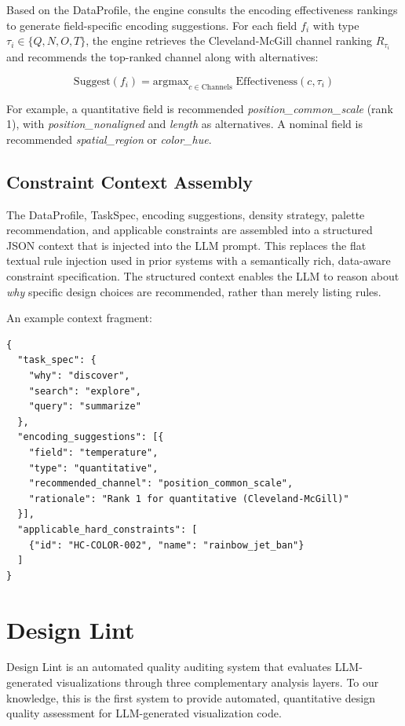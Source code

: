 \documentclass[journal]{vgtc}
\begin{document}
Based on the DataProfile, the engine consults the encoding effectiveness rankings to generate field-specific encoding suggestions.
For each field $f_i$ with type $\tau_i \in \{Q, N, O, T\}$, the engine retrieves the Cleveland-McGill channel ranking $R_{\tau_i}$ and recommends the top-ranked channel along with alternatives:

\begin{equation}
\text{Suggest}(f_i) = \text{argmax}_{c \in \text{Channels}} \; \text{Effectiveness}(c, \tau_i)
\end{equation}

For example, a quantitative field is recommended \textit{position\_common\_scale} (rank 1), with \textit{position\_nonaligned} and \textit{length} as alternatives.
A nominal field is recommended \textit{spatial\_region} or \textit{color\_hue}.

\subsection{Constraint Context Assembly}

The DataProfile, TaskSpec, encoding suggestions, density strategy, palette recommendation, and applicable constraints are assembled into a structured JSON context that is injected into the LLM prompt.
This replaces the flat textual rule injection used in prior systems with a semantically rich, data-aware constraint specification.
The structured context enables the LLM to reason about \textit{why} specific design choices are recommended, rather than merely listing rules.

An example context fragment:
\begin{verbatim}
{
  "task_spec": {
    "why": "discover",
    "search": "explore",
    "query": "summarize"
  },
  "encoding_suggestions": [{
    "field": "temperature",
    "type": "quantitative",
    "recommended_channel": "position_common_scale",
    "rationale": "Rank 1 for quantitative (Cleveland-McGill)"
  }],
  "applicable_hard_constraints": [
    {"id": "HC-COLOR-002", "name": "rainbow_jet_ban"}
  ]
}
\end{verbatim}

\section{Design Lint}

Design Lint is an automated quality auditing system that evaluates LLM-generated visualizations through three complementary analysis layers.
To our knowledge, this is the first system to provide automated, quantitative design quality assessment for LLM-generated visualization code.
\end{document}
